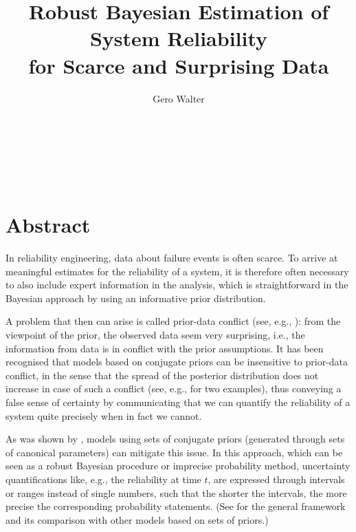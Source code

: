 \documentclass[12pt,a4paper,twocolumn,fleqn]{narmsabs}
\begin{document}
\title{Robust Bayesian Estimation of System Reliability\\ for Scarce and Surprising Data}
\author{{Gero Walter} \\
{} \\
{} \\
\\
{}\\
{} \\
{}}
\maketitle


\section*{Abstract}

In reliability engineering, data about failure events is often scarce.
To arrive at meaningful estimates for the reliability of a system,
it is therefore often necessary to also include expert information in the analysis,
which is straightforward in the Bayesian approach by using an informative prior distribution.

A problem that then can arise is called prior-data conflict (see, e.g., \cite{2006:evans}):
from the viewpoint of the prior, the observed data seem very surprising,
i.e., the information from data is in conflict with the prior assumptions.
It has been recognised that models based on conjugate priors can be insensitive to prior-data conflict,
in the sense that the spread of the posterior distribution does not increase in case of such a conflict
(see, e.g., \cite[\S A.1.2]{diss} for two examples),
thus conveying a false sense of certainty by communicating that we can quantify the reliability of a system quite precisely
when in fact we cannot.

As was shown by \cite{Walter2009a}, models using sets of conjugate priors %
(generated through sets of canonical parameters) can mitigate this issue.
In this approach, which can be seen as a robust Bayesian procedure or imprecise probability method,
uncertainty quantifications like, e.g., the reliability at time $t$,
are expressed through intervals or ranges instead of single numbers,
such that the shorter the intervals, the more precise the corresponding probability statements.
(See \cite[\S 3.1 and \S 3.2]{diss} for the general framework and its comparison with other models based on sets of priors.)
\end{document}
